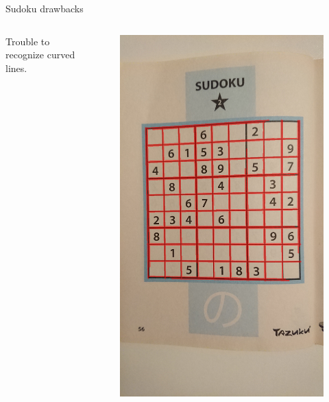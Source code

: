 \documentclass[12pt]{beamer}
\begin{document}
\begin{frame}{Sudoku drawbacks}
    \begin{columns}
        Trouble to recognize curved lines.
        \begin{figure}
            \includegraphics[width=\textwidth]{resources/png/sudoku_00011_04.png}
        \end{figure}
    \end{columns}
\end{frame}
\end{document}
